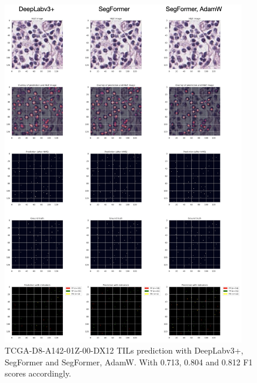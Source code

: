 \begin{figure}[H]
    \centering
    \includegraphics[width=0.95\textwidth]{figures/tils/TCGA-D8-A142-01Z-00-DX12.png}
    \caption{TCGA-D8-A142-01Z-00-DX12 TILs prediction with DeepLabv3+, SegFormer and
    SegFormer, AdamW. With 0.713, 0.804 and 0.812 F1 scores accordingly.}
    \label{fig:TCGA-D8-A142_tils}
\end{figure}

